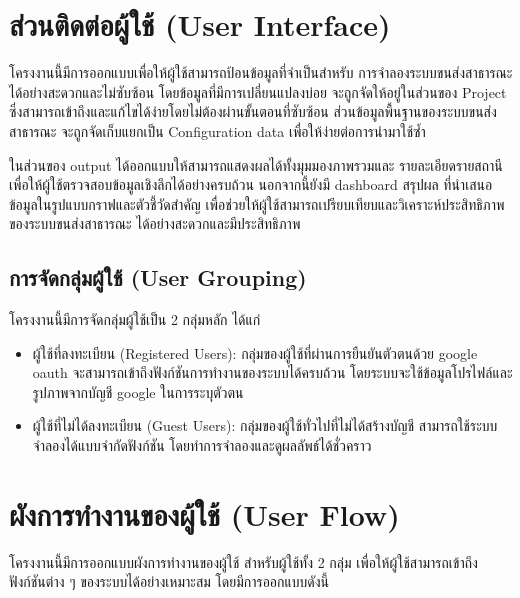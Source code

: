 \section{ส่วนติดต่อผู้ใช้ (User Interface)}
\begin{mypara}
    \indent โครงงานนี้มีการออกแบบเพื่อให้ผู้ใช้สามารถป้อนข้อมูลที่จำเป็นสำหรับ
    การจำลองระบบขนส่งสาธารณะได้อย่างสะดวกและไม่ซับซ้อน 
    โดยข้อมูลที่มีการเปลี่ยนแปลงบ่อย จะถูกจัดให้อยู่ในส่วนของ Project
    ซึ่งสามารถเข้าถึงและแก้ไขได้ง่ายโดยไม่ต้องผ่านขั้นตอนที่ซับซ้อน 
    ส่วนข้อมูลพื้นฐานของระบบขนส่งสาธารณะ จะถูกจัดเก็บแยกเป็น Configuration data 
    เพื่อให้ง่ายต่อการนำมาใช้ซ้ำ 

  \indent ในส่วนของ output ได้ออกแบบให้สามารถแสดงผลได้ทั้งมุมมองภาพรวมและ
  รายละเอียดรายสถานี เพื่อให้ผู้ใช้ตรวจสอบข้อมูลเชิงลึกได้อย่างครบถ้วน นอกจากนี้ยังมี 
  dashboard สรุปผล ที่นำเสนอข้อมูลในรูปแบบกราฟและตัวชี้วัดสำคัญ 
  เพื่อช่วยให้ผู้ใช้สามารถเปรียบเทียบและวิเคราะห์ประสิทธิภาพของระบบขนส่งสาธารณะ
  ได้อย่างสะดวกและมีประสิทธิภาพ
\end{mypara}

\subsection{การจัดกลุ่มผู้ใช้ (User Grouping)}
\begin{mypara}
\indent โครงงานนี้มีการจัดกลุ่มผู้ใช้เป็น 2 กลุ่มหลัก ได้แก่
\begin{itemize}
    \item ผู้ใช้ที่ลงทะเบียน (Registered Users): กลุ่มของผู้ใช้ที่ผ่านการยืนยันตัวตนด้วย google oauth 
    จะสามารถเข้าถึงฟังก์ชันการทำงานของระบบได้ครบถ้วน โดยระบบจะใช้ข้อมูลโปรไฟล์และรูปภาพจากบัญชี google ในการระบุตัวตน
    \item ผู้ใช้ที่ไม่ได้ลงทะเบียน (Guest Users): กลุ่มของผู้ใช้ทั่วไปที่ไม่ได้สร้างบัญชี 
    สามารถใช้ระบบจำลองได้แบบจำกัดฟังก์ชัน โดยทำการจำลองและดูผลลัพธ์ได้ชั่วคราว 
\end{itemize}
\end{mypara}
\section{ผังการทำงานของผู้ใช้ (User Flow)}
\begin{mypara}
    \indent โครงงานนี้มีการออกแบบผังการทำงานของผู้ใช้ สำหรับผู้ใช้ทั้ง 2 กลุ่ม เพื่อให้ผู้ใช้สามารถเข้าถึงฟังก์ชันต่าง ๆ ของระบบได้อย่างเหมาะสม 
    โดยมีการออกแบบดังนี้
\end{mypara}
